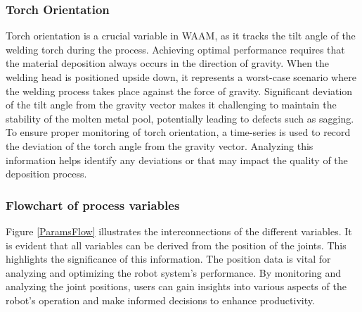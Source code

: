 

\subsubsection*{Torch Orientation}
Torch orientation is a crucial variable in \acrshort{WAAM}, as it tracks the tilt angle of the welding torch during the process. Achieving optimal performance requires that the material deposition always occurs in the direction of gravity. When the welding head is positioned upside down, it represents a worst-case scenario where the welding process takes place against the force of gravity. Significant deviation of the tilt angle from the gravity vector makes it challenging to maintain the stability of the molten metal pool, potentially leading to defects such as sagging. To ensure proper monitoring of torch orientation, a time-series is used to record the deviation of the torch angle from the gravity vector. Analyzing this information helps identify any deviations or that may impact the quality of the deposition process.




\subsubsection*{Flowchart of process variables}
Figure \ref{ParamsFlow} illustrates the interconnections of the different variables. It is evident that all variables can be derived from the position of the joints. This highlights the significance of this information. The position data is vital for analyzing and optimizing the robot system's performance. By monitoring and analyzing the joint positions, users can gain insights into various aspects of the robot's operation and make informed decisions to enhance productivity.
\newpage

